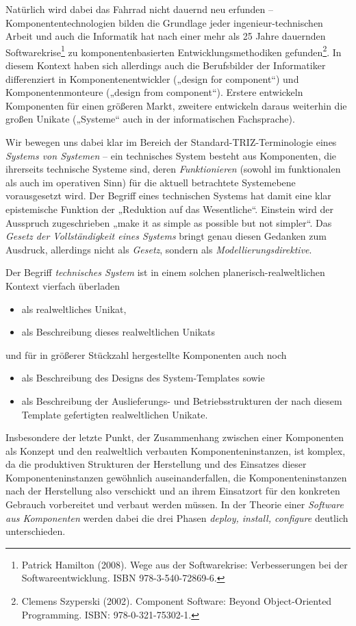 \documentclass[11pt,a4paper]{article}
\begin{document}
Natürlich wird dabei das Fahrrad nicht dauernd neu erfunden --
Komponententechnologien bilden die Grundlage jeder ingenieur-technischen
Arbeit und auch die Informatik hat nach einer mehr als 25 Jahre dauernden
Softwarekrise\footnote{Patrick Hamilton (2008). Wege aus der Softwarekrise:
  Verbesserungen bei der Softwareentwicklung. ISBN 978-3-540-72869-6.} zu
komponentenbasierten Entwicklungsmethodiken gefunden\footnote{Clemens
  Szyperski (2002). Component Software: Beyond Object-Oriented
  Programming. ISBN: 978-0-321-75302-1.}.  In diesem Kontext haben sich
allerdings auch die Berufsbilder der Informatiker differenziert in
Komponentenentwickler („design for component“) und Komponentenmonteure
(„design from component“).  Erstere entwickeln Komponenten für einen größeren
Markt, zweitere entwickeln daraus weiterhin die großen Unikate („Systeme“ auch
in der informatischen Fachsprache).

Wir bewegen uns dabei klar im Bereich der Standard-TRIZ-Terminologie eines
\emph{Systems von Systemen} -- ein technisches System besteht aus Komponenten,
die ihrerseits technische Systeme sind, deren \emph{Funktionieren} (sowohl im
funktionalen als auch im operativen Sinn) für die aktuell betrachtete
Systemebene vorausgesetzt wird. Der Begriff eines technischen Systems hat
damit eine klar epistemische Funktion der „Reduktion auf das Wesentliche“.
Einstein wird der Ausspruch zugeschrieben „make it as simple as possible but
not simpler“. Das \emph{Gesetz der Vollständigkeit eines Systems} bringt genau
diesen Gedanken zum Ausdruck, allerdings nicht als \emph{Gesetz}, sondern als
\emph{Modellierungsdirektive}.

Der Begriff \emph{technisches System} ist in einem solchen
planerisch-realweltlichen Kontext vierfach überladen
\begin{itemize}
\item [1.] als realweltliches Unikat,
\item [2.] als Beschreibung dieses realweltlichen Unikats
\end{itemize}
und für in größerer Stückzahl hergestellte Komponenten auch noch
\begin{itemize}
\item [3.] als Beschreibung des Designs des System-Templates sowie
\item [4.] als Beschreibung der Auslieferungs- und Betriebsstrukturen der nach
  diesem Template gefertigten realweltlichen Unikate. 
\end{itemize}

Insbesondere der letzte Punkt, der Zusammenhang zwischen einer Komponenten als
Konzept und den realweltlich verbauten Komponenteninstanzen, ist komplex, da
die produktiven Strukturen der Herstellung und des Einsatzes dieser
Komponenteninstanzen gewöhnlich auseinanderfallen, die Komponenteninstanzen
nach der Herstellung also verschickt und an ihrem Einsatzort für den konkreten
Gebrauch vorbereitet und verbaut werden müssen. In der Theorie einer
\emph{Software aus Komponenten} werden dabei die drei Phasen \emph{deploy,
  install, configure} deutlich unterschieden. 
\end{document}

